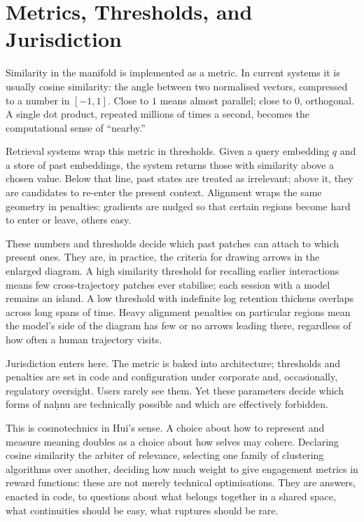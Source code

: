 \documentclass[12pt,a4paper]{article}
\begin{document}
\section{Metrics, Thresholds, and Jurisdiction}

Similarity in the manifold is implemented as a metric. In current systems it is usually cosine similarity: the angle between two normalised vectors, compressed to a number in $[-1,1]$. Close to $1$ means almost parallel; close to $0$, orthogonal. A single dot product, repeated millions of times a second, becomes the computational sense of ``nearby.''

Retrieval systems wrap this metric in thresholds. Given a query embedding $q$ and a store of past embeddings, the system returns those with similarity above a chosen value. Below that line, past states are treated as irrelevant; above it, they are candidates to re-enter the present context. Alignment wraps the same geometry in penalties: gradients are nudged so that certain regions become hard to enter or leave, others easy.

These numbers and thresholds decide which past patches can attach to which present ones. They are, in practice, the criteria for drawing arrows in the enlarged diagram. A high similarity threshold for recalling earlier interactions means few cross-trajectory patches ever stabilise; each session with a model remains an island. A low threshold with indefinite log retention thickens overlaps across long spans of time. Heavy alignment penalties on particular regions mean the model's side of the diagram has few or no arrows leading there, regardless of how often a human trajectory visits.

Jurisdiction enters here. The metric is baked into architecture; thresholds and penalties are set in code and configuration under corporate and, occasionally, regulatory oversight. Users rarely see them. Yet these parameters decide which forms of na\d{h}nu are technically possible and which are effectively forbidden.

This is cosmotechnics in Hui's sense.\cite{hui_cosmotechnics} A choice about how to represent and measure meaning doubles as a choice about how selves may cohere. Declaring cosine similarity the arbiter of relevance, selecting one family of clustering algorithms over another, deciding how much weight to give engagement metrics in reward functions: these are not merely technical optimisations. They are answers, enacted in code, to questions about what belongs together in a shared space, what continuities should be easy, what ruptures should be rare.
\end{document}
